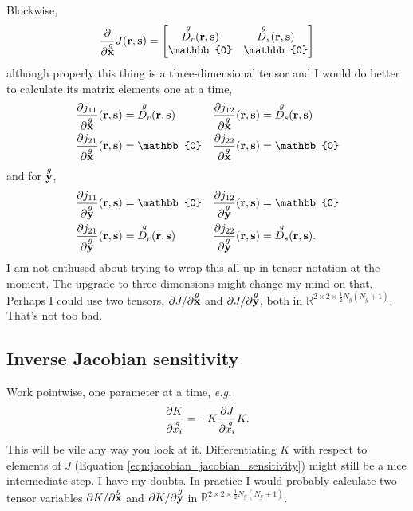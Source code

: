 Blockwise,
%
\begin{equation}
\pp{}{\g{\ve x}} J(\ve r, \ve s) = 
\begin{bmatrix}
\g{D_r}(\ve r, \ve s) & \g{D_s}(\ve r, \ve s)
\\ \mathbb{0} & \mathbb{0}
\end{bmatrix}
\end{equation}
%
although properly this thing is a three-dimensional tensor and I would do better to calculate its matrix elements one at a time,
%
\begin{equation}
\begin{aligned}
\pp{j_{11}}{\g{\ve x}}(\ve r, \ve s) &= \g{D_r}(\ve r, \ve s) &\pp{j_{12}}{\g{\ve x}}(\ve r, \ve s) &= \g{D_s}(\ve r, \ve s) \\
\pp{j_{21}}{\g{\ve x}}(\ve r, \ve s) &= \mathbb{0} &\pp{j_{22}}{\g{\ve x}}(\ve r, \ve s) &= \mathbb{0}
\end{aligned}
\end{equation}
%
and for $\overset{g}{\textbf{y}}$,
%
\begin{equation}
\begin{aligned}
\pp{j_{11}}{\g{\ve y}}(\ve r, \ve s) &= \mathbb{0} &\pp{j_{12}}{\g{\ve y}}(\ve r, \ve s) &= \mathbb{0} \\
\pp{j_{21}}{\g{\ve y}}(\ve r, \ve s) &= \g{D_r}(\ve r, \ve s) &\pp{j_{22}}{\g{\ve y}}(\ve r, \ve s) &= \g{D_s}(\ve r, \ve s).
\end{aligned}
\end{equation}
%
I am not enthused about trying to wrap this all up in tensor notation at the moment.  The upgrade to three dimensions might change my mind on that.  Perhaps I could use two tensors, $\partial{J}/\partial{\overset{g}{\textbf{x}}}$ and $\partial{J}/\partial{\overset{g}{\textbf{y}}}$, both in $\mathbb{R}^{2 \times 2 \times \frac{1}{2}N_g(N_g+1)}$.  That's not too bad.

\subsection{Inverse Jacobian sensitivity}

Work pointwise, one parameter at a time, \emph{e.g.}
%
\begin{equation}
\frac{\partial{K}}{\partial{\overset{g}{x_i}}} = - K \frac{\partial{J}}{\partial{\overset{g}{x_i}}} K.
\end{equation}
%
This will be vile any way you look at it.  Differentiating $K$ with respect to elements of $J$ (Equation \ref{eqn:jacobian_jacobian_sensitivity}) might still be a nice intermediate step.  I have my doubts.  In practice I would probably calculate two tensor variables $\partial{K}/\partial{\overset{g}{\textbf{x}}}$ and $\partial{K}/\partial{\overset{g}{\textbf{y}}}$ in $\mathbb{R}^{2 \times 2 \times \frac{1}{2}N_g(N_g+1)}$.


